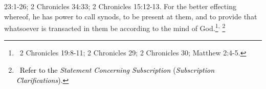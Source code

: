 {{{{{{{{{{{{{23:1-26; 2 Chronicles 34:33; 2 Chronicles 15:12-13.} For the better effecting
whereof, he has power to call synods, to be present at them, and to provide that whatsoever is transacted in them be according to
the mind of God.\footnote{\ 2 Chronicles 19:8-11; 2 Chronicles
29; 2 Chronicles 30; Matthew 2:4-5.}\textsuperscript{,}
\footnote{\ \textcolor{black}{Refer to the }\textit{\textcolor{black}{Statement Concerning Subscription
}}\textcolor{black}{(}\textit{\textcolor{black}{Subscription Clarifications}}\textcolor{black}{).}}


\bigskip

}}}}}}}}}}}}
